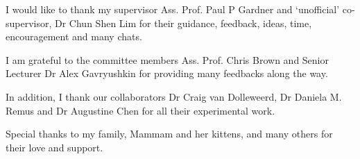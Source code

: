 \begin{acknowledgements}
I would like to thank my supervisor Ass. Prof. Paul P Gardner and `unofficial' co-supervisor, Dr Chun Shen Lim for their guidance, feedback, ideas, time, encouragement and many chats. 

I am grateful to the committee members Ass. Prof. Chris Brown and Senior Lecturer Dr Alex Gavryushkin for providing many feedbacks along the way. 

In addition, I thank our collaborators Dr Craig van Dolleweerd, Dr Daniela M. Remus and Dr Augustine Chen for all their experimental work.

Special thanks to my family, Mammam and her kittens, and many others for their love and support.

\end{acknowledgements}